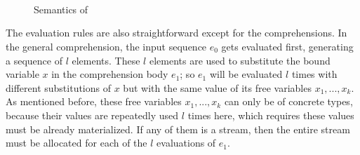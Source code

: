 \begin{figure}\large

	\\[4ex]
	\PT{
		\Axiom{\Eval{\rho}{\{\}\tau}{\{\}}}
	}\\[4ex]
	\\[4ex]
	\\[4ex]
	
	\\[4ex]	
	\\[4ex]
	\\[4ex]
	\\
\caption{Semantics of \mysnesl \label{fig:mysnesl-semantics}}
\end{figure}

The evaluation rules are also straightforward except for the comprehensions.
In the general comprehension, the input sequence $e_0$ gets evaluated first, generating a sequence of $l$ elements.
These $l$ elements are used to substitute the bound variable $x$ in the comprehension body $e_1$; so $e_1$ will be evaluated $l$ times with different substitutions of $x$ but with the same value of its free variables $x_1,...,x_k$.
As mentioned before, these free variables $x_1,..., x_k$ can only be of concrete types, because their values are repeatedly used $l$ times here, which requires these values must be already materialized. 
If any of them is a stream, then the entire stream must be allocated for each of the $l$ evaluations of $e_1$.



